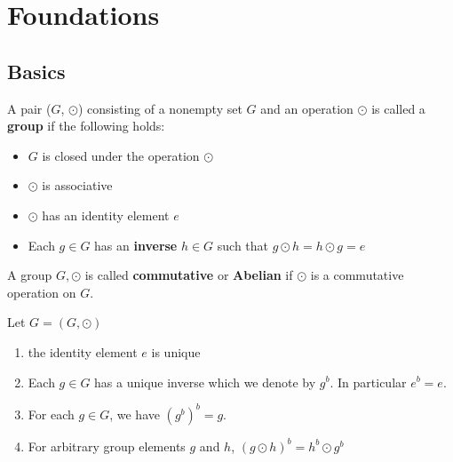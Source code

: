 \chapter{Foundations}\label{ch:Foundations}


\section{Basics}
\begin{definition}[Group]\label{def:group}
	A pair (\(G\), \(\odot	\)) consisting of a nonempty set \(G\) and an operation \(\odot\)
	is called a \textbf{group} if the following holds:
	\begin{itemize}
		\item \(G\) is closed under the operation \(\odot\)
		\item \(\odot\) is associative
		\item \(\odot\) has an identity element \(e\)
		\item Each \(g \in G\) has an \textbf{inverse} \(h \in G\) such that \(g \odot h = h \odot g = e\)
	\end{itemize}
	
\end{definition}

\begin{definition}\label{def:abelian-group}
	A group \(G, \odot\) is called \textbf{commutative} or \textbf{Abelian}
	if \(\odot\) is a commutative operation on \(G\).
\end{definition}

\begin{remark} 
	Let \(G = \left(G, \odot\right) \)
	\begin{enumerate}[label=(\alph*)]
		\item the identity element \(e\) is unique
		\item Each \(g \in G\) has a unique inverse which we denote by \(g^b\). In particular \(e^b = e\).
		\item For each \(g \in G\), we have \(\left(g^b\right)^b = g\). 
		\item For arbitrary group elements \(g\) and \(h\), \(\left(g \odot h\right)^b = h^b \odot g^b\)
	\end{enumerate}
\end{remark}

